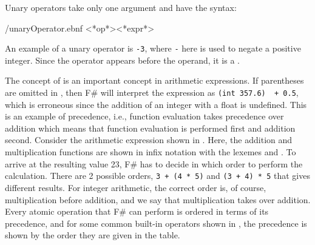 \documentclass[fsharpNotes.tex]{subfiles}
\begin{document}
Unary operators take only one argument and have the syntax:
%
\begin{verbatimwrite}{\ebnf/unaryOperator.ebnf}
<*op*><*expr*>
\end{verbatimwrite}
%
An example of a unary operator is \lstinline!-3!, where \lstinline!-! here is used to negate a positive integer. Since the operator appears before the operand, it is a . 

The concept of  is an important concept in arithmetic expressions. If parentheses are omitted in , then F\# will interpret the expression as \lstinline|(int 357.6)  + 0.5|, which is erroneous since the addition of an integer with a float is undefined. This is an example of precedence, i.e., function evaluation takes precedence over addition which means that function evaluation is performed first and addition second. Consider the arithmetic expression shown in .
%
%
Here, the addition and multiplication functions are shown in infix notation with the  lexemes \lexeme{+} and \lexeme{*}. To arrive at the resulting value 23, F\# has to decide in which order to perform the calculation. There are 2 possible orders, \lstinline|3 + (4 * 5)| and \lstinline|(3 + 4) * 5| that gives different results. For integer arithmetic, the correct order is, of course, multiplication before addition, and we say that multiplication takes  over addition. Every atomic operation that F\# can perform is ordered in terms of its precedence, and for some common built-in operators shown in , the precedence is shown by the order they are given in the table.
\end{document}
